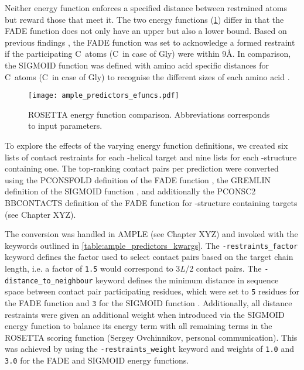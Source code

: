 Neither energy function enforces a specified distance between restrained atoms but reward those that meet it. The two energy functions (\cref{fig:ample_predictors_efuncs}) differ in that the FADE function does not only have an upper but also a lower bound. Based on previous findings \cite{Michel2014-ci, Skwark2014-mu}, the FADE function was set to acknowledge a formed restraint if the participating C\textbeta\ atoms (C\textalpha\ in case of Gly) were within 9\AA. In comparison, the SIGMOID function was defined with amino acid specific distances for C\textbeta\ atoms (C\textalpha\ in case of Gly) to recognise the different sizes of each amino acid \cite{Kamisetty2013-bs, Ovchinnikov2015-nt}.

\begin{figure}[H]
    \centering
    \texttt{[image: ample\_predictors\_efuncs.pdf]}
    \caption{ROSETTA energy function comparison. Abbreviations corresponds to input parameters.}
    \label{fig:ample_predictors_efuncs}
\end{figure}

To explore the effects of the varying energy function definitions, we created six lists of contact restraints for each \textalpha-helical target and nine lists for each \textbeta-structure containing one. The top-ranking contact pairs per prediction were converted using the PCONSFOLD definition of the FADE function \cite{Michel2014-ci}, the GREMLIN definition of the SIGMOID function \cite{Ovchinnikov2015-nt}, and additionally the PCONSC2 BBCONTACTS definition of the FADE function for \textbeta-structure containing targets (see Chapter XYZ).

The conversion was handled in AMPLE (see Chapter XYZ) and invoked with the keywords outlined in \cref{table:ample_predictors_kwargs}. The \texttt{-restraints\_factor} keyword defines the factor used to select contact pairs based on the target chain length, i.e. a factor of \texttt{1.5} would correspond to 3\textit{L}/2 contact pairs. The \texttt{-distance\_to\_neighbour} keyword defines the minimum distance in sequence space between contact pair participating residues, which were set to \texttt{5} residues for the FADE function \cite{Michel2014-ci} and \texttt{3} for the SIGMOID function \cite{Ovchinnikov2015-nt}. Additionally, all distance restraints were given an additional weight when introduced via the SIGMOID energy function to balance its energy term with all remaining terms in the ROSETTA scoring function (Sergey Ovchinnikov, personal communication). This was achieved by using the \texttt{-restraints\_weight} keyword and weights of \texttt{1.0} and \texttt{3.0} for the FADE and SIGMOID energy functions.

